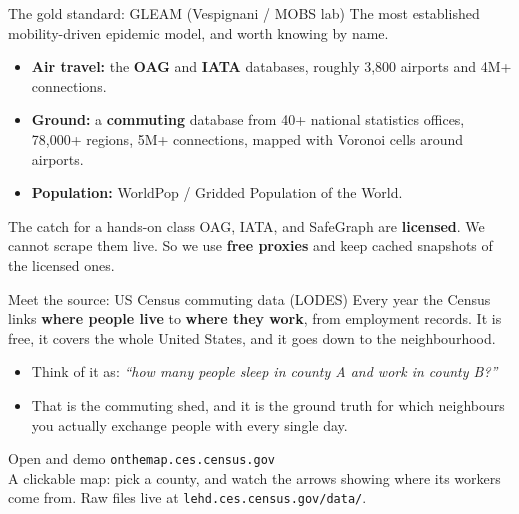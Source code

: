 \documentclass[aspectratio=169,11pt]{beamer}
\begin{document}
\begin{frame}{The gold standard: GLEAM (Vespignani / MOBS lab)}
  The most established mobility-driven epidemic model, and worth knowing by name.
  \begin{itemize}
    \item \textbf{Air travel:} the \textbf{OAG} and \textbf{IATA} databases, roughly 3,800
          airports and 4M+ connections.
    \item \textbf{Ground:} a \textbf{commuting} database from 40+ national statistics
          offices, 78,000+ regions, 5M+ connections, mapped with Voronoi cells around
          airports.
    \item \textbf{Population:} WorldPop / Gridded Population of the World.
  \end{itemize}
  \vspace{0.3em}
  \begin{alertblock}{The catch for a hands-on class}
    OAG, IATA, and SafeGraph are \textbf{licensed}. We cannot scrape them live. So we use
    \textbf{free proxies} and keep cached snapshots of the licensed ones.
  \end{alertblock}
\end{frame}

\begin{frame}{Meet the source: US Census commuting data (LODES)}
  Every year the Census links \textbf{where people live} to \textbf{where they work}, from
  employment records. It is free, it covers the whole United States, and it goes down to the
  neighbourhood.
  \begin{itemize}
    \item Think of it as: \emph{``how many people sleep in county A and work in county B?''}
    \item That is the commuting shed, and it is the ground truth for which neighbours you
          actually exchange people with every single day.
  \end{itemize}
  \begin{exampleblock}{Open and demo}
    \texttt{onthemap.ces.census.gov} \\
    A clickable map: pick a county, and watch the arrows showing where its workers come
    from. Raw files live at \texttt{lehd.ces.census.gov/data/}.
  \end{exampleblock}
\end{frame}
\end{document}
